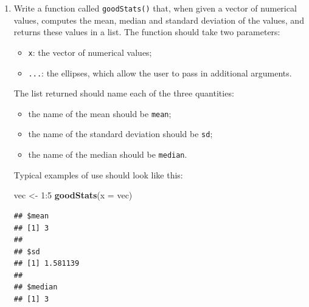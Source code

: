 \documentclass[]{book}
\makeatletter
\newenvironment{Shaded}{\begin{snugshade}}{\end{snugshade}}
\newcommand{\KeywordTok}[1]{\textcolor[rgb]{0.13,0.29,0.53}{\textbf{{#1}}}}
\newcommand{\DataTypeTok}[1]{\textcolor[rgb]{0.13,0.29,0.53}{{#1}}}
\newcommand{\DecValTok}[1]{\textcolor[rgb]{0.00,0.00,0.81}{{#1}}}
\newcommand{\StringTok}[1]{\textcolor[rgb]{0.31,0.60,0.02}{{#1}}}
\newcommand{\NormalTok}[1]{{#1}}
\providecommand{\tightlist}{%
  \setlength{\itemsep}{0pt}\setlength{\parskip}{0pt}}
\newenvironment{kframe}{%
\medskip{}
\setlength{\fboxsep}{.8em}
 \def\at@end@of@kframe{}%
 \ifinner\ifhmode%
  \def\at@end@of@kframe{\end{minipage}}%
  \begin{minipage}{\columnwidth}%
 \fi\fi%
 \def\FrameCommand##1{\hskip\@totalleftmargin \hskip-\fboxsep
 \colorbox{shadecolor}{##1}\hskip-\fboxsep
     \hskip-\linewidth \hskip-\@totalleftmargin \hskip\columnwidth}%
 \MakeFramed {\advance\hsize-\width
   \@totalleftmargin\z@ \linewidth\hsize
   \@setminipage}}%
 {\par\unskip\endMakeFramed%
 \at@end@of@kframe}
\renewenvironment{Shaded}{\begin{kframe}}{\end{kframe}}
\theoremstyle{definition}
\theoremstyle{definition}
\theoremstyle{remark}
\makeatother
\begin{document}
{\begin{enumerate}
  For each of the following objects, find at least two ways to access it
  within \texttt{lst}:

  \begin{itemize}
  \tightlist
  \item
    the vector of letters from ``c'' to ``j'';
  \item
    the capital letter ``F'';
  \item
    the vector of numbers from 1 to 10;
  \item
    the heights of the five tallest individuals in \texttt{m111survey}.
  \end{itemize}
\item
  Write a function called \texttt{goodStats()} that, when given a vector
  of numerical values, computes the mean, median and standard deviation
  of the values, and returns these values in a list. The function should
  take two parameters:

  \begin{itemize}
  \tightlist
  \item
    \texttt{x}: the vector of numerical values;
  \item
    \texttt{...}: the ellipses, which allow the user to pass in
    additional arguments.
  \end{itemize}

  The list returned should name each of the three quantities:

  \begin{itemize}
  \tightlist
  \item
    the name of the mean should be \texttt{mean};
  \item
    the name of the standard deviation should be \texttt{sd};
  \item
    the name of the median should be \texttt{median}.
  \end{itemize}

  Typical examples of use should look like this:

\begin{Shaded}
\begin{Highlighting}[]
\NormalTok{vec <-}\StringTok{ }\DecValTok{1}\NormalTok{:}\DecValTok{5}
\KeywordTok{goodStats}\NormalTok{(}\DataTypeTok{x =} \NormalTok{vec)}
\end{Highlighting}
\end{Shaded}

\begin{verbatim}
## $mean
## [1] 3
## 
## $sd
## [1] 1.581139
## 
## $median
## [1] 3
\end{verbatim}


\end{enumerate}}
\end{document}
